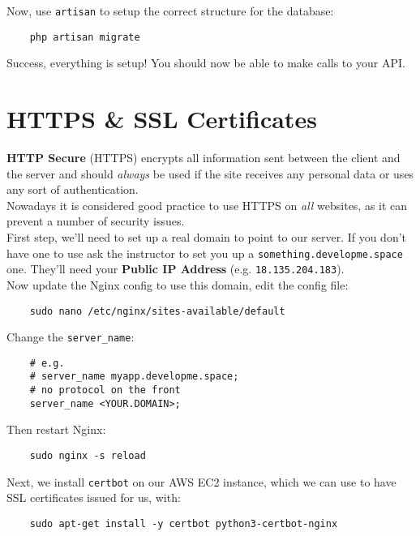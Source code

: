 Now, use \texttt{artisan} to setup the correct structure for the database:

\begin{verbatim}
    php artisan migrate
\end{verbatim}

Success, everything is setup! You should now be able to make calls to your API.


\section{HTTPS \& SSL Certificates}

\textbf{HTTP Secure} (HTTPS) encrypts all information sent between the client and the server and should \textit{always} be used if the site receives any personal data or uses any sort of authentication.
\\

Nowadays it is considered good practice to use HTTPS on \textit{all} websites, as it can prevent a number of security issues.
\\

First step, we'll need to set up a real domain to point to our server. If you don't have one to use ask the instructor to set you up a \texttt{something.developme.space} one. They'll need your \textbf{Public IP Address} (e.g. \texttt{18.135.204.183}).
\\

Now update the Nginx config to use this domain, edit the config file:

\begin{verbatim}
    sudo nano /etc/nginx/sites-available/default
\end{verbatim}

Change the \texttt{server\_name}:

\begin{verbatim}
    # e.g.
    # server_name myapp.developme.space;
    # no protocol on the front
    server_name <YOUR.DOMAIN>;
\end{verbatim}

Then restart Nginx:

\begin{verbatim}
    sudo nginx -s reload
\end{verbatim}

Next, we install \texttt{certbot} on our AWS EC2 instance, which we can use to have SSL certificates issued for us, with:

\begin{verbatim}
    sudo apt-get install -y certbot python3-certbot-nginx
\end{verbatim}

